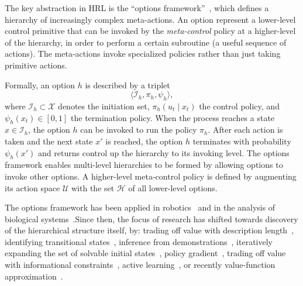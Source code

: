The key abstraction in HRL is the ``options framework''~\cite{suttonPS99}, which defines a hierarchy of increasingly complex meta-actions.
 An option represent a lower-level control primitive that can be invoked by the \emph{meta-control} policy at a higher-level of the hierarchy, in order to perform a certain subroutine (a useful sequence of actions).
The meta-actions invoke specialized policies rather than just taking primitive actions.

 Formally, an option $h$ is described by a triplet \[\langle \mathcal{I}_h, \pi_h, \psi_h \rangle,\] where $\mathcal{I}_h \subset \mathcal{X}$ denotes the initiation set, $\pi_h(u_t \mid x_t)$ the control policy, and $\psi_h(x_t) \in [0,1]$ the termination policy. When the process reaches a state $x \in \mathcal{I}_h$, the option $h$ can be invoked to run the policy $\pi_h$. After each action is taken and the next state $x'$ is reached, the option $h$ terminates with probability $\psi_h(x')$ and returns control up the hierarchy to its invoking level. The options framework enables multi-level hierarchies to be formed by allowing options to invoke other options. A higher-level meta-control policy is defined by augmenting its action space $\mathcal{U}$ with the set $\mathcal{H}$ of all lower-level options. 

The options framework has been applied in robotics~\cite{konidarisKGB12, krishnan2016swirl, sermanet2016unsupervised} and in the analysis of biological systems~\cite{botvinick08,botvinick2009hierarchically,solway2014optimal,zacksKEH11,whitenFBL06}.Since then, the focus of research has shifted towards discovery of the hierarchical structure itself, by: trading off value with description length~\cite{thrunS94}, identifying transitional states~\cite{mcgovernB01,menacheMS02,simsekB04,stolle04,lakshminarayananKKR16}, inference from demonstrations~\cite{buiVW02,krishnan2015transition,daniel2012hierarchical,krishnan2016swirl}, iteratively expanding the set of solvable initial states~\cite{konidarisB09,konidarisKGB12}, policy gradient~\cite{LevyS11}, trading off value with informational constraints~\cite{geneweinLGB15,foxMT16,jonssonG16,florensaDA17}, active learning~\cite{hamidiTGF15}, or recently value-function approximation~\cite{baconHP16,heess2016learning,sharmaLR17}.


